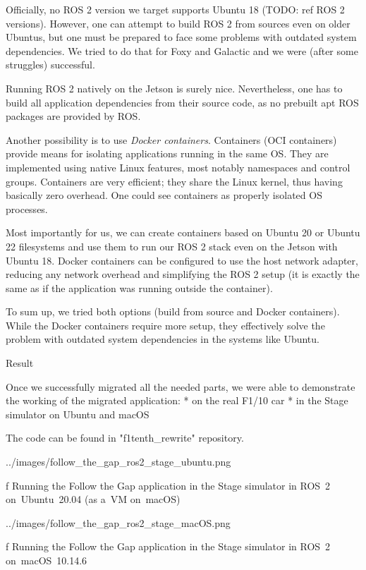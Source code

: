 Officially, no ROS 2 version we target supports Ubuntu 18 (TODO: ref ROS 2 versions). However, one can attempt to build ROS 2 from sources even on older Ubuntus, but one must be prepared to face some problems with outdated system dependencies. We tried to do that for Foxy and Galactic and we were (after some struggles) successful.

Running ROS 2 natively on the Jetson is surely nice. Nevertheless, one has to build all application dependencies from their source code, as no prebuilt apt ROS packages are provided by ROS.

Another possibility is to use {\em Docker containers}. Containers (OCI containers) provide means for isolating applications running in the same OS. They are implemented using native Linux features, most notably namespaces and control groups. Containers are very efficient; they share the Linux kernel, thus having basically zero overhead. One could see containers as properly isolated OS processes.

Most importantly for us, we can create containers based on Ubuntu 20 or Ubuntu 22 filesystems and use them to run our ROS 2 stack even on the Jetson with Ubuntu 18. Docker containers can be configured to use the host network adapter, reducing any network overhead and simplifying the ROS 2 setup (it is exactly the same as if the application was running outside the container).

To sum up, we tried both options (build from source and Docker containers). While the Docker containers require more setup, they effectively solve the problem with outdated system dependencies in the systems like Ubuntu.


\sec Result

Once we successfully migrated all the needed parts, we were able to demonstrate the working of the migrated application:
\begitems
* {\sbf on the real F1/10 car}
* in the Stage simulator on Ubuntu and macOS
\enditems

The code can be found in "f1tenth_rewrite" repository.

\midinsert
{}
\picw=14cm \cinspic ../images/follow_the_gap_ros2_stage_ubuntu.png
\caption/f Running the Follow the Gap application in the Stage simulator in ROS~2 on~Ubuntu~20.04 (as a~VM on~macOS)
\endinsert

\midinsert
{}
\picw=14cm \cinspic ../images/follow_the_gap_ros2_stage_macOS.png
\caption/f Running the Follow the Gap application in the Stage simulator in ROS~2 \hbox{on~macOS~10.14.6}
\endinsert
